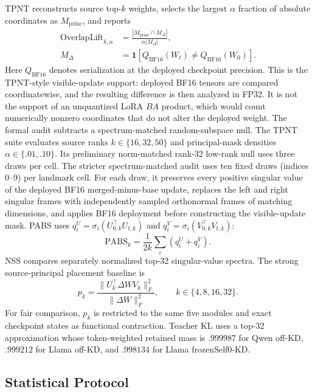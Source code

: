\documentclass[letterpaper]{article} %
\begin{document}
TPNT reconstructs source top-$k$ weights, selects the largest $\alpha$ fraction of
absolute coordinates as $M_{\mathrm{princ}}$, and reports
\begin{equation}
\begin{aligned}
\mathrm{OverlapLift}_{k,\alpha}
&=\frac{|M_{\mathrm{princ}}\cap M_\Delta|}{\alpha|M_\Delta|},\\
M_\Delta&=\mathbf1[
Q_{\mathrm{BF16}}(W_t)\ne Q_{\mathrm{BF16}}(W_0)].
\end{aligned}
\end{equation}
Here $Q_{\mathrm{BF16}}$ denotes serialization at the deployed checkpoint precision.
This is the TPNT-style visible-update support: deployed BF16 tensors are compared
coordinatewise, and the resulting difference is then analyzed in FP32. It is not the
support of an unquantized LoRA $BA$ product, which would count numerically nonzero
coordinates that do not alter the deployed weight. The formal audit subtracts a
spectrum-matched random-subspace null. The TPNT suite evaluates source ranks
$k\in\{16,32,50\}$ and principal-mask densities
$\alpha\in\{.01,.10\}$. Its preliminary norm-matched rank-32 low-rank null uses
three draws per cell. The stricter spectrum-matched audit uses ten fixed draws
(indices 0--9) per landmark cell. For each draw, it preserves every positive singular
value of the deployed BF16 merged-minus-base update, replaces the left and right
singular frames with independently sampled orthonormal frames of matching dimensions,
and applies BF16 deployment before constructing the visible-update mask.
PABS uses
$q_i^U=\sigma_i(U_{0,k}^\top U_{t,k})$ and
$q_i^V=\sigma_i(V_{0,k}^\top V_{t,k})$:
\begin{equation}
\mathrm{PABS}_k=\frac{1}{2k}\sum_i(q_i^U+q_i^V).
\end{equation}
NSS compares separately normalized top-32 singular-value spectra. The strong
source-principal placement baseline is
\begin{equation}
p_k=\frac{\|U_k^\top\Delta W V_k\|_F^2}{\|\Delta W\|_F^2},
\qquad k\in\{4,8,16,32\}.
\end{equation}
For fair comparison, $p_k$ is restricted to the same five modules and exact checkpoint
states as functional contraction. Teacher KL uses a top-32 approximation whose
token-weighted retained mass is $.999987$ for Qwen off-KD, $.999212$ for Llama off-KD,
and $.998134$ for Llama frozenSelf0-KD.

\subsection{Statistical Protocol}
\end{document}
